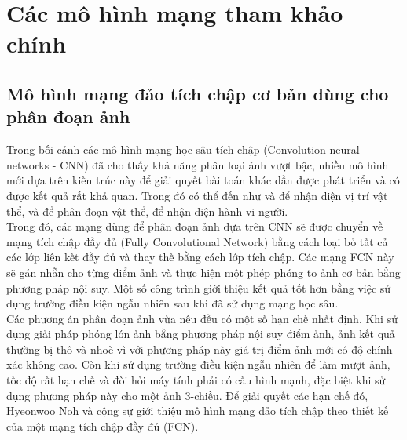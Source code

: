 \chapter{Các mô hình mạng tham khảo chính}
\section{Mô hình mạng đảo tích chập cơ bản dùng cho phân đoạn ảnh}
Trong bối cảnh các mô hình mạng học sâu tích chập (Convolution neural networks - CNN) đã cho thấy khả năng phân loại ảnh vượt bậc, nhiều mô hình mới dựa trên kiến trúc này để giải quyết bài toán khác dần được phát triển và có được kết quả rất khả quan. Trong đó có thể đến như \cite{object_detection_ex1} và \cite{object_detection_ex2} để nhận diện vị trí vật thể, \cite{segmentation_ex1} và \cite{segmentation_ex2} để phân đoạn vật thể, \cite{action_recognize_ex1} để nhận diện hành vi người.\\
Trong đó, các mạng dùng để phân đoạn ảnh dựa trên CNN sẽ được chuyển về mạng tích chập đầy đủ (Fully Convolutional Network) bằng cách loại bỏ tất cả các lớp liên kết đầy đủ và thay thế bằng cách lớp tích chập. Các mạng FCN này sẽ gán nhẵn cho từng điểm ảnh và thực hiện một phép phóng to ảnh cơ bản bằng phương pháp nội suy. Một số công trình giới thiệu kết quả tốt hơn bằng việc sử dụng trường điều kiện ngẫu nhiên sau khi đã sử dụng mạng học sâu.\\
Các phương án phân đoạn ảnh vừa nêu đều có một số hạn chế nhất định. Khi sử dụng giải pháp phóng lớn ảnh bằng phương pháp nội suy điểm ảnh, ảnh kết quả thường bị thô và nhoè vì với phương pháp này giá trị điểm ảnh mới có độ chính xác không cao. Còn khi sử dụng trường điều kiện ngẫu nhiên để làm mượt ảnh, tốc độ rất hạn chế và đòi hỏi máy tính phải có cấu hình mạnh, đặc biệt khi sử dụng phương pháp này cho một ảnh 3-chiều. Để giải quyết các hạn chế đó, Hyeonwoo Noh và cộng sự giới thiệu mô hình mạng đảo tích chập \cite{unpoolref} theo thiết kế của một mạng tích chập đầy đủ (FCN).
